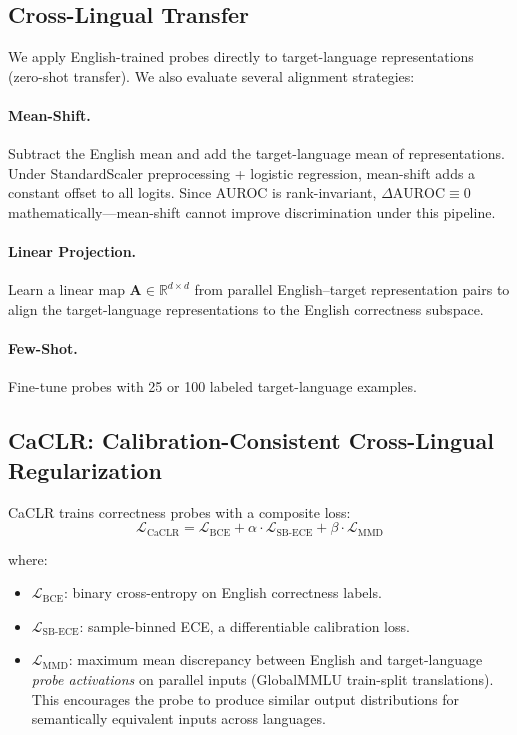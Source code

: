 \documentclass[11pt,a4paper]{article}
\begin{document}
\subsection{Cross-Lingual Transfer}
\label{sec:method:transfer}

We apply English-trained probes directly to target-language representations (zero-shot transfer).
We also evaluate several alignment strategies:

\paragraph{Mean-Shift.}
Subtract the English mean and add the target-language mean of representations.
Under StandardScaler preprocessing + logistic regression, mean-shift adds a constant offset to all logits.
Since AUROC is rank-invariant, $\Delta\text{AUROC} \equiv 0$ mathematically---mean-shift cannot improve discrimination under this pipeline.

\paragraph{Linear Projection.}
Learn a linear map $\mathbf{A} \in \mathbb{R}^{d \times d}$ from parallel English--target representation pairs to align the target-language representations to the English correctness subspace.

\paragraph{Few-Shot.}
Fine-tune probes with 25 or 100 labeled target-language examples.

\subsection{CaCLR: Calibration-Consistent Cross-Lingual Regularization}
\label{sec:method:caclr}

CaCLR trains correctness probes with a composite loss:
\begin{equation}
    \mathcal{L}_\text{CaCLR} = \mathcal{L}_\text{BCE} + \alpha \cdot \mathcal{L}_\text{SB-ECE} + \beta \cdot \mathcal{L}_\text{MMD}
\end{equation}

\noindent where:
\begin{itemize}[nosep,leftmargin=*]
    \item $\mathcal{L}_\text{BCE}$: binary cross-entropy on English correctness labels.
    \item $\mathcal{L}_\text{SB-ECE}$: sample-binned ECE, a differentiable calibration loss.
    \item $\mathcal{L}_\text{MMD}$: maximum mean discrepancy between English and target-language \emph{probe activations} on parallel inputs (GlobalMMLU train-split translations). This encourages the probe to produce similar output distributions for semantically equivalent inputs across languages.
\end{itemize}
\end{document}
